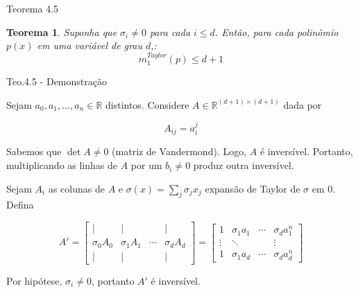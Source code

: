 \documentclass{beamer}
\newtheorem{teo}{Teorema}[section]
\theoremstyle{definition}
\begin{document}
\begin{frame}{Teorema 4.5}
    \begin{teo}
        Suponha que $\sigma_i \neq 0$ para cada $i \leq d$. Então, para cada polinômio $p(x)$ em uma variável de grau $d$,:
        \begin{equation*}
            m_1^{Taylor}(p) \leq d+1
        \end{equation*}
    \end{teo}
\end{frame}

\begin{frame}{Teo.4.5 - Demonstração}
    \small

    Sejam $a_0, a_1, \dots, a_n \in \mathbb R$ distintos. \pause Considere $A \in \mathbb R^{(d+1) \times (d+1)}$ dada por

    \begin{equation*}
        A_{ij} = a_i^j         
    \end{equation*}

    \pause \vspace{1em}

    Sabemos que $\det A \neq 0$ (matriz de Vandermond). Logo, $A$ é inversível. \pause Portanto, multiplicando as linhas de $A$ por um $b_i\neq 0$ produz outra inversível.

    \pause \vspace{1em}

    Sejam $A_i$ as colunas de $A$ e $\sigma(x) = \sum_j \sigma_j x_j$ expansão de Taylor de $\sigma$ em 0. Defina

    \begin{equation*}
        A' = \begin{bmatrix}
            |  & | & & | \\
            \sigma_0 A_0 & \sigma_1 A_1 & \cdots & \sigma_d A_d \\
            |  & | & & | 
        \end{bmatrix} = 
        \begin{bmatrix}
            1 & \sigma_1 a_1 & \cdots & \sigma_d a_1^n \\
            \vdots & \ddots & &  \vdots \\
            1 & \sigma_1 a_d & \cdots & \sigma_d a_d^n 
        \end{bmatrix}
    \end{equation*}
    
    \pause

    Por hipótese, $\sigma_i \neq 0$, portanto $A'$ é inversível.
\end{frame}
\end{document}
